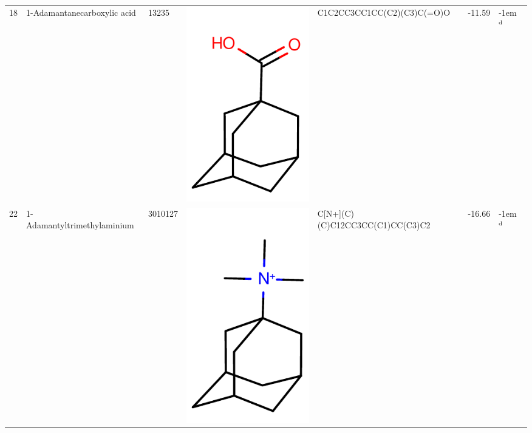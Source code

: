 \documentclass[aps,pre,twocolumn,nofootinbib,superscriptaddress,10pt, final,tightenlines]{revtex4-1}
\begin{document}
\begin{table}
\begin{tabular}{lllp{1.5cm}>{\ttfamily}lS[table-format=-1.2, table-figures-uncertainty=1]l}
18 & 1-Adamantanecarboxylic acid        & 13235     & \parbox[c]{1em}{\includegraphics[scale=0.2]{figures/13235.pdf}}     & C1C2CC3CC1CC(C2)(C3)C(=O)O                   & -11.59  & \kern-1em {$^{\rm d}$}  \\
22 & 1-Adamantyltrimethylaminium        & 3010127   & \parbox[c]{1em}{\includegraphics[scale=0.2]{figures/3010127.pdf}}   & C[N+](C)(C)C12CC3CC(C1)CC(C3)C2              & -16.66  & \kern-1em {$^{\rm d}$}  \\

\end{tabular}
\end{table}
\end{document}
